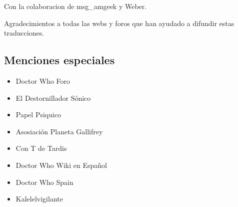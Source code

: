 Con la colaboracion de msg\_amgeek y Weber.

Agradecimientos a todas las webs y foros que han ayudado a difundir
estas traducciones.

\subsection*{Menciones especiales}\label{menciones-especiales}

\begin{itemize}
\itemsep1pt\parskip0pt
\item
  Doctor Who Foro
\item
  El Destornillador Sónico
\item
  Papel Psiquico
\item
  Asosiación Planeta Gallifrey
\item
  Con T de Tardis
\item
  Doctor Who Wiki en Español
\item
  Doctor Who Spain
\item
  Kalelelvigilante
\end{itemize}
